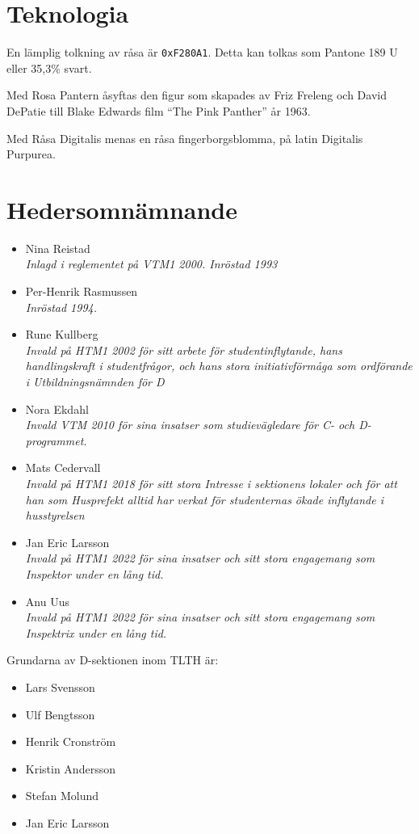 \documentclass{dsekregulations}
\begin{document}
\coverpage
\section{Teknologia}

 En lämplig tolkning av råsa är \texttt{0xF280A1}. Detta kan
tolkas som Pantone 189 U eller 35,3\% svart.

 Med Rosa Pantern åsyftas den figur som skapades av
Friz Freleng och David DePatie till Blake Edwards film ``The Pink Panther'' år
1963.

 Med Råsa Digitalis menas en råsa fingerborgsblomma,
på latin Digitalis Purpurea.

\section{Hedersomnämnande}


\begin{itemize}
\item Nina Reistad \\
  \emph{Inlagd i reglementet på VTM1 2000. Inröstad 1993}
\item Per-Henrik Rasmussen \\ \emph{Inröstad 1994.}
\item Rune Kullberg \\
  \emph{Invald på HTM1 2002 för sitt arbete för studentinflytande, hans
  handlingskraft i studentfrågor, och hans stora initiativförmåga som
  ordförande i Utbildningsnämnden för D}
\item Nora Ekdahl \\
  \emph{Invald VTM 2010 för sina insatser som studievägledare för C- och
  D-programmet.}
\item Mats Cedervall \\
  \emph{Invald på HTM1 2018 för sitt stora Intresse i sektionens lokaler och
  för att han som Husprefekt alltid har verkat för studenternas ökade
  inflytande i husstyrelsen}
\item Jan Eric Larsson \\
  \emph{Invald på HTM1 2022 för sina insatser och sitt stora engagemang som
  Inspektor under en lång tid.}
\item Anu Uus \\
  \emph{Invald på HTM1 2022 för sina insatser och sitt stora engagemang som
  Inspektrix under en lång tid.}
\end{itemize}

 Grundarna av D-sektionen inom
TLTH är:
\begin{itemize}
\item Lars Svensson
\item Ulf Bengtsson
\item Henrik Cronström
\item Kristin Andersson
\item Stefan Molund
\item Jan Eric Larsson
\end{itemize}
\end{document}
